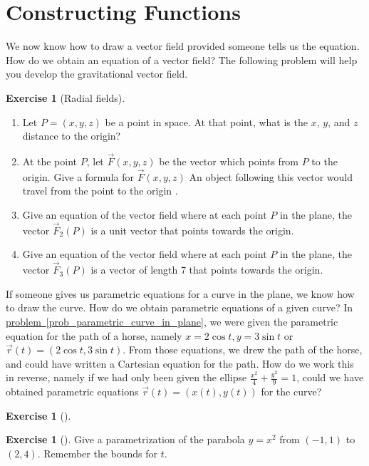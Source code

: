 \documentclass[10pt,]{book}
\theoremstyle{plain}
\theoremstyle{definition}
\theoremstyle{definition}
\theoremstyle{definition}
\theoremstyle{definition}
\newtheorem{exploration}[project]{Exercise}
\theoremstyle{definition}
\numberwithin{equation}{section}
\newcommand{\ds}{\displaystyle}
\begin{document}
\section[{Constructing Functions}]{Constructing Functions}\label{section-19}
We now know how to draw a vector field provided someone tells us the equation. How do we obtain an equation of a vector field? The following problem will help you develop the gravitational vector field.%
\begin{exploration}[Radial fields]\label{exploration-121}
\leavevmode%
\begin{enumerate}[font=\bfseries,label=(\alph*),ref=\alph*]
\item\label{task-243} Let \(P=(x,y,z)\) be a point in space. At that point, what is the \(x\), \(y\), and \(z\) distance to the origin?%
\item\label{task-244} At the point \(P\), let \(\vec F(x,y,z)\) be the vector which points from \(P\) to the origin.  Give a formula for \(\vec F(x,y,z)\) An object following this vector would travel from the point to the origin%
 .%
\item\label{task-245} Give an equation of the vector field where at each point \(P\) in the plane, the vector \(\vec F_2(P)\) is a unit vector that points towards the origin.%
\item\label{task-246} Give an equation of the vector field where at each point \(P\) in the plane, the vector \(\vec F_3(P)\) is a vector of length 7 that points towards the origin.%
\end{enumerate}
\end{exploration}
If someone gives us parametric equations for a curve in the plane, we know how to draw the curve. How do we obtain parametric equations of a given curve? In \hyperref[prob_parametric_curve_in_plane]{problem~\ref{prob_parametric_curve_in_plane}}, we were given the parametric equation for the path of a horse, namely \(x=2\cos t, y=3 \sin t\) or \(\vec r(t)=(2\cos t,3\sin t)\). From those equations, we drew the path of the horse, and could have written a Cartesian equation for the path. How do we work this in reverse, namely if we had only been given the ellipse \(\ds\frac{x^2}{4}+\frac{y^2}{9}=1\), could we have obtained parametric equations \(\vec r(t)=(x(t),y(t))\) for the curve?%
\begin{exploration}[]\label{exploration-122}
\end{exploration}
\begin{exploration}[]\label{exploration-123}
Give a parametrization of the parabola \(y=x^2\) from \((-1,1)\) to \((2,4)\). Remember the bounds for \(t\).%
\end{exploration}
\end{document}
